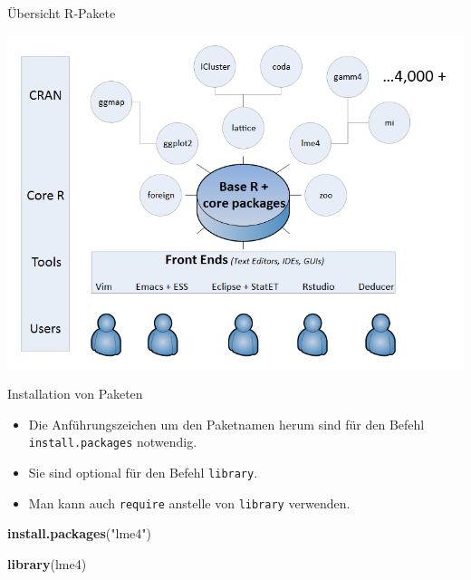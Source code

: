 \documentclass[ignorenonframetext,]{beamer}
\newenvironment{Shaded}{\begin{snugshade}}{\end{snugshade}}
\newcommand{\KeywordTok}[1]{\textcolor[rgb]{0.13,0.29,0.53}{\textbf{#1}}}
\newcommand{\NormalTok}[1]{#1}
\newcommand{\StringTok}[1]{\textcolor[rgb]{0.31,0.60,0.02}{#1}}
\providecommand{\tightlist}{%
  \setlength{\itemsep}{0pt}\setlength{\parskip}{0pt}}
\begin{document}
\begin{frame}{Übersicht R-Pakete}
\protect\hypertarget{ubersicht-r-pakete}{}

\includegraphics{figure/Packages.PNG}

\end{frame}

\begin{frame}[fragile]{Installation von Paketen}
\protect\hypertarget{installation-von-paketen}{}

\begin{itemize}
\tightlist
\item
  Die Anführungszeichen um den Paketnamen herum sind für den Befehl
  \texttt{install.packages} notwendig.
\item
  Sie sind optional für den Befehl \texttt{library}.
\item
  Man kann auch \texttt{require} anstelle von \texttt{library}
  verwenden.
\end{itemize}

\begin{Shaded}
\begin{Highlighting}[]
\KeywordTok{install.packages}\NormalTok{(}\StringTok{"lme4"}\NormalTok{)}

\KeywordTok{library}\NormalTok{(lme4)}
\end{Highlighting}
\end{Shaded}

\end{frame}
\end{document}
